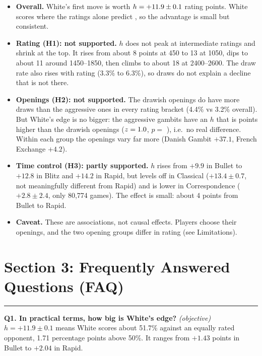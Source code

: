 \documentclass[11pt,a4paper]{article}
\begin{document}
\begin{itemize}
\item \textbf{Overall.} White's first move is worth $h=+11.9\pm0.1$ rating points. White scores \ScoreAll{} where the ratings alone predict \ExpectedAll{}, so the advantage is small but consistent.
\item \textbf{Rating (H1): not supported.} $h$ does not peak at intermediate ratings and shrink at the top. It rises from about 8 points at 450 to 13 at 1050, dips to about 11 around 1450--1850, then climbs to about 18 at 2400--2600. The draw rate also rises with rating (3.3\% to 6.3\%), so draws do not explain a decline that is not there.
\item \textbf{Openings (H2): not supported.} The drawish openings do have more draws than the aggressive ones in every rating bracket (4.4\% vs 3.2\% overall). But White's edge is no bigger: the aggressive gambits have an $h$ that is \CompareDiff{} points higher than the drawish openings ($z=1.0$, $p = $ \CompareP), i.e.\ no real difference. Within each group the openings vary far more (Danish Gambit $+37.1$, French Exchange $+4.2$).
\item \textbf{Time control (H3): partly supported.} $h$ rises from $+9.9$ in Bullet to $+12.8$ in Blitz and $+14.2$ in Rapid, but levels off in Classical ($+13.4\pm0.7$, not meaningfully different from Rapid) and is lower in Correspondence ($+2.8\pm2.4$, only 80{,}774 games). The effect is small: about 4 points from Bullet to Rapid.
\item \textbf{Caveat.} These are associations, not causal effects. Players choose their openings, and the two opening groups differ in rating (see Limitations).
\end{itemize}


\newpage

\section*{Section 3: Frequently Answered Questions (FAQ)}
\hrule
\textbf{Q1. In practical terms, how big is White's edge?} \emph{(objective)}\\
$h=+11.9\pm0.1$ means White scores about 51.7\% against an equally rated opponent, 1.71 percentage
points above 50\%. It ranges from $+1.43$ points in Bullet to $+2.04$ in Rapid.
\end{document}
